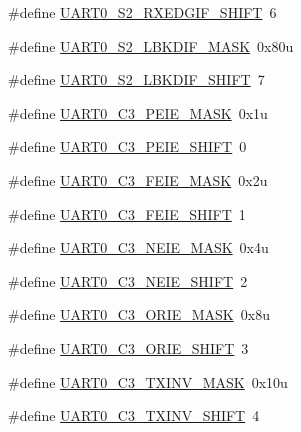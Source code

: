 \begin{DoxyCompactItemize}
\#define \hyperlink{group___u_a_r_t0___register___masks_ga0e308d65c84418d41a1e1e7e08d2f49a}{U\+A\+R\+T0\+\_\+\+S2\+\_\+\+R\+X\+E\+D\+G\+I\+F\+\_\+\+S\+H\+I\+FT}~6
\item 
\#define \hyperlink{group___u_a_r_t0___register___masks_gac15518365f64c684798c3480deaf83f0}{U\+A\+R\+T0\+\_\+\+S2\+\_\+\+L\+B\+K\+D\+I\+F\+\_\+\+M\+A\+SK}~0x80u
\item 
\#define \hyperlink{group___u_a_r_t0___register___masks_gabeff0aee55751aab92571d26a934a04a}{U\+A\+R\+T0\+\_\+\+S2\+\_\+\+L\+B\+K\+D\+I\+F\+\_\+\+S\+H\+I\+FT}~7
\item 
\#define \hyperlink{group___u_a_r_t0___register___masks_ga756c38b1457b21e8bc4c364f890b7390}{U\+A\+R\+T0\+\_\+\+C3\+\_\+\+P\+E\+I\+E\+\_\+\+M\+A\+SK}~0x1u
\item 
\#define \hyperlink{group___u_a_r_t0___register___masks_gafce96820de4fce25539d9bc3f0bee376}{U\+A\+R\+T0\+\_\+\+C3\+\_\+\+P\+E\+I\+E\+\_\+\+S\+H\+I\+FT}~0
\item 
\#define \hyperlink{group___u_a_r_t0___register___masks_gaa01da5d1e8dc6f89dc58c0104beba4b2}{U\+A\+R\+T0\+\_\+\+C3\+\_\+\+F\+E\+I\+E\+\_\+\+M\+A\+SK}~0x2u
\item 
\#define \hyperlink{group___u_a_r_t0___register___masks_gaafe99b12e9534395e8c36a86dd3d2e98}{U\+A\+R\+T0\+\_\+\+C3\+\_\+\+F\+E\+I\+E\+\_\+\+S\+H\+I\+FT}~1
\item 
\#define \hyperlink{group___u_a_r_t0___register___masks_ga44fe8fd48c0fac9eda6b76bba6174f45}{U\+A\+R\+T0\+\_\+\+C3\+\_\+\+N\+E\+I\+E\+\_\+\+M\+A\+SK}~0x4u
\item 
\#define \hyperlink{group___u_a_r_t0___register___masks_ga60c064efad2eef2bc2ebebe2c0ffd1b9}{U\+A\+R\+T0\+\_\+\+C3\+\_\+\+N\+E\+I\+E\+\_\+\+S\+H\+I\+FT}~2
\item 
\#define \hyperlink{group___u_a_r_t0___register___masks_ga728e7b520b1f4122c701a1fec02dce60}{U\+A\+R\+T0\+\_\+\+C3\+\_\+\+O\+R\+I\+E\+\_\+\+M\+A\+SK}~0x8u
\item 
\#define \hyperlink{group___u_a_r_t0___register___masks_ga01878e41bfd1652bb4c6e4a27a11dd68}{U\+A\+R\+T0\+\_\+\+C3\+\_\+\+O\+R\+I\+E\+\_\+\+S\+H\+I\+FT}~3
\item 
\#define \hyperlink{group___u_a_r_t0___register___masks_gaead58bbfecceef15fc563180b19dea48}{U\+A\+R\+T0\+\_\+\+C3\+\_\+\+T\+X\+I\+N\+V\+\_\+\+M\+A\+SK}~0x10u
\item 
\#define \hyperlink{group___u_a_r_t0___register___masks_ga7866d64fd9c0f5acb07399d3d575902f}{U\+A\+R\+T0\+\_\+\+C3\+\_\+\+T\+X\+I\+N\+V\+\_\+\+S\+H\+I\+FT}~4
\item 

\end{DoxyCompactItemize}
